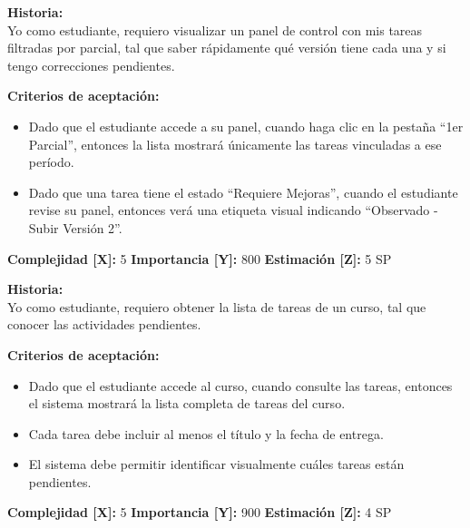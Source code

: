 \documentclass[12pt,a4paper]{article}
\begin{document}
\vspace{0.5em}

\begin{tcolorbox}[title=\textbf{HU-06: Panel de seguimiento de versiones y estado de tareas}]
\textbf{Historia:} \\
Yo como estudiante, requiero visualizar un panel de control con mis tareas filtradas por parcial, tal que saber rápidamente qué versión tiene cada una y si tengo correcciones pendientes.

\vspace{0.5em}
\textbf{Criterios de aceptación:}
\begin{itemize}
    \item Dado que el estudiante accede a su panel, cuando haga clic en la pestaña ``1er Parcial'', entonces la lista mostrará únicamente las tareas vinculadas a ese período.
    \item Dado que una tarea tiene el estado ``Requiere Mejoras'', cuando el estudiante revise su panel, entonces verá una etiqueta visual indicando ``Observado - Subir Versión 2''.
\end{itemize}
\textbf{Complejidad [X]:} 5 \hfill \textbf{Importancia [Y]:} 800 \hfill \textbf{Estimación [Z]:} 5 SP
\end{tcolorbox}

\vspace{0.5em}

\begin{tcolorbox}[title=\textbf{HU-07: Consultar listado de tareas de un curso}]
\textbf{Historia:} \\
Yo como estudiante, requiero obtener la lista de tareas de un curso, tal que conocer las actividades pendientes.

\vspace{0.5em}
\textbf{Criterios de aceptación:}
\begin{itemize}
    \item Dado que el estudiante accede al curso, cuando consulte las tareas, entonces el sistema mostrará la lista completa de tareas del curso.
    \item Cada tarea debe incluir al menos el título y la fecha de entrega.
    \item El sistema debe permitir identificar visualmente cuáles tareas están pendientes.
\end{itemize}
\textbf{Complejidad [X]:} 5 \hfill \textbf{Importancia [Y]:} 900 \hfill \textbf{Estimación [Z]:} 4 SP
\end{tcolorbox}
\end{document}
